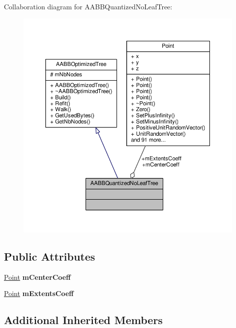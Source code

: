 Collaboration diagram for A\+A\+B\+B\+Quantized\+No\+Leaf\+Tree\+:
\nopagebreak
\begin{figure}[H]
\begin{center}
\leavevmode
\includegraphics[width=350pt]{d0/d37/classAABBQuantizedNoLeafTree__coll__graph}
\end{center}
\end{figure}
\subsection*{Public Attributes}
\begin{DoxyCompactItemize}
\item 
\hyperlink{classPoint}{Point} {\bfseries m\+Center\+Coeff}\hypertarget{classAABBQuantizedNoLeafTree_aa809fdb1fc8661847b3f4db825d88108}{}\label{classAABBQuantizedNoLeafTree_aa809fdb1fc8661847b3f4db825d88108}

\item 
\hyperlink{classPoint}{Point} {\bfseries m\+Extents\+Coeff}\hypertarget{classAABBQuantizedNoLeafTree_afc58a1ef3cd7de690b2f00b2a07662c0}{}\label{classAABBQuantizedNoLeafTree_afc58a1ef3cd7de690b2f00b2a07662c0}

\end{DoxyCompactItemize}
\subsection*{Additional Inherited Members}



